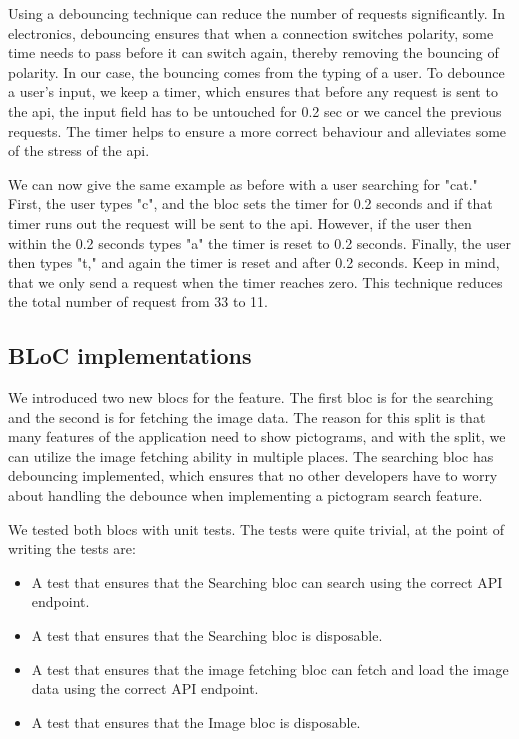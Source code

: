 Using a debouncing technique can reduce the number of requests significantly. In electronics, debouncing ensures that when a connection switches polarity, some time needs to pass before it can switch again, thereby removing the bouncing of polarity. In our case, the bouncing comes from the typing of a user. To debounce a user's input, we keep a timer, which ensures that before any request is sent to the \gls{api}, the input field has to be untouched for 0.2 sec or we cancel the previous requests. The timer helps to ensure a more correct behaviour and alleviates some of the stress of the \gls{api}.

We can now give the same example as before with a user searching for "cat." First, the user types "c", and the \gls{bloc} sets the timer for 0.2 seconds and if that timer runs out the request will be sent to the \gls{api}. However, if the user then within the 0.2 seconds types "a" the timer is reset to 0.2 seconds. Finally, the user then types "t," and again the timer is reset and after 0.2 seconds. Keep in mind, that we only send a request when the timer reaches zero. This technique reduces the total number of request from 33 to 11.

\subsection{BLoC implementations}
We introduced two new \glspl{bloc} for the feature. The first \gls{bloc} is for the searching and the second is for fetching the image data. The reason for this split is that many features of the application need to show pictograms, and with the split, we can utilize the image fetching ability in multiple places. The searching \gls{bloc} has debouncing implemented, which ensures that no other developers have to worry about handling the debounce when implementing a pictogram search feature.

We tested both \glspl{bloc} with unit tests. The tests were quite trivial, at the point of writing the tests are:

\begin{itemize}
  \item A test that ensures that the Searching \gls{bloc} can search using the correct API endpoint.
  \item A test that ensures that the Searching \gls{bloc} is disposable.
  \item A test that ensures that the image fetching \gls{bloc} can fetch and load the image data using the correct API endpoint.
  \item A test that ensures that the Image \gls{bloc} is disposable.
\end{itemize}

